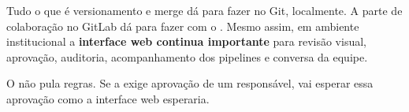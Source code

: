 Tudo o que é versionamento e merge dá para fazer no Git, localmente. A parte de colaboração no GitLab dá para fazer com o . Mesmo assim, em ambiente institucional a \textbf{interface web continua importante} para revisão visual, aprovação, auditoria, acompanhamento dos pipelines e conversa da equipe.

\begin{atencao}
O  não pula regras. Se a  exige aprovação de um responsável,  vai esperar essa aprovação como a interface web esperaria.
\end{atencao}
